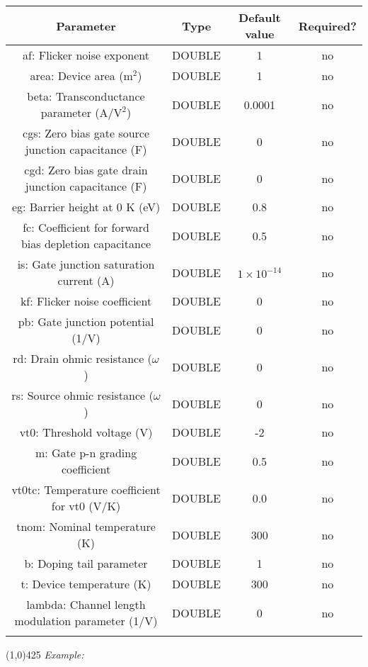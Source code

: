 \documentclass{article}
\begin{document}
\begin{table}[H]
\begin{tabular}{|c|c|c|c|}
\hline
Parameter&Type&Default value&Required?\\
\hline
af: Flicker noise exponent & DOUBLE & 1 & no\\
\hline
area: Device area ($\textrm{m}^2$) & DOUBLE & 1 & no\\
\hline
beta: Transconductance parameter ($\textrm{A}/\textrm{V}^2$)& DOUBLE & 0.0001 & no\\
\hline
cgs: Zero bias gate source junction capacitance (F) & DOUBLE & 0 & no\\
\hline
cgd: Zero bias gate drain junction capacitance (F)& DOUBLE & 0 & no\\
\hline
eg: Barrier height at 0 K (eV) & DOUBLE & 0.8 & no\\
\hline
fc: Coefficient for forward bias depletion capacitance & DOUBLE & 0.5 & no\\
\hline
is: Gate junction saturation current (A)& DOUBLE & $1\times10^{-14}$ & no\\
\hline
kf: Flicker noise coefficient & DOUBLE & 0 & no\\
\hline
pb: Gate junction potential (1/V)& DOUBLE & 0 & no\\
\hline
rd: Drain ohmic resistance ($\omega$)& DOUBLE & 0 & no\\
\hline
rs: Source ohmic resistance ($\omega$) & DOUBLE & 0 & no\\
\hline
vt0: Threshold voltage (V)& DOUBLE & -2 & no\\
\hline
m: Gate p-n grading coefficient & DOUBLE & 0.5 & no\\
\hline
vt0tc: Temperature coefficient for vt0 (V/K) & DOUBLE & 0.0 & no\\
\hline
tnom: Nominal temperature (K)& DOUBLE & 300 & no\\
\hline
b: Doping tail parameter & DOUBLE & 1 & no\\
\hline
t: Device temperature (K) & DOUBLE & 300 & no\\
\hline
lambda: Channel length modulation parameter (1/V) & DOUBLE & 0 & no\\
\par
\hline
\end{tabular}
\end{table}
\noindent\linethickness{0.5mm}\line(1,0){425}
\newline
\textit{Example:}%
\newline
\end{document}

